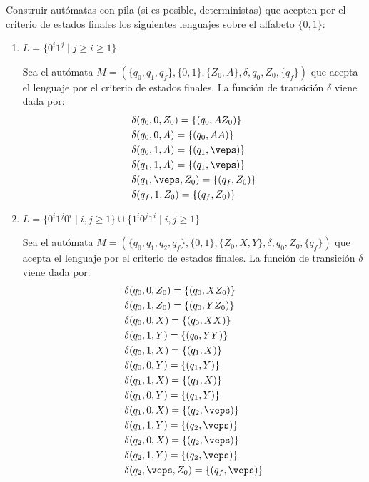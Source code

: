 \begin{ejercicio}\label{ej:1.5.20}
    Construir autómatas con pila (si es posible, deterministas) que acepten por el criterio de estados finales los siguientes lenguajes sobre el alfabeto $\{0,1\}$:
    \begin{enumerate}
        \item $L = \{0^i 1^j \mid j\geq i \geq 1\}$.
        
        Sea el autómata $M = (\{q_0,q_1,q_f\},\{0,1\},\{Z_0,A\},\delta,q_0,Z_0,\{q_f\})$ que acepta el lenguaje por el criterio de estados finales. La función de transición $\delta$ viene dada por:
        \begin{align*}
            &\delta(q_0,0,Z_0) = \{(q_0,AZ_0)\} \\
            &\delta(q_0,0,A) = \{(q_0,AA)\} \\
            &\delta(q_0,1,A) = \{(q_1,\veps)\} \\
            &\delta(q_1,1,A) = \{(q_1,\veps)\} \\
            &\delta(q_1,\veps,Z_0) = \{(q_f,Z_0)\} \\
            &\delta(q_f,1,Z_0) = \{(q_f,Z_0)\}
        \end{align*}
        \item $L = \{0^i 1^j 0^i \mid i,j\geq 1\}\cup \{1^i 0^j 1^i \mid i,j\geq 1\}$
        
        Sea el autómata $M = (\{q_0,q_1,q_2,q_f\},\{0,1\},\{Z_0,X,Y\},\delta,q_0,Z_0,\{q_f\})$ que acepta el lenguaje por el criterio de estados finales. La función de transición $\delta$ viene dada por:
        \begin{align*}
            &\delta(q_0,0,Z_0) = \{(q_0,XZ_0)\} \\
            &\delta(q_0,1,Z_0) = \{(q_0,YZ_0)\} \\
            &\delta(q_0,0,X) = \{(q_0,XX)\} \\
            &\delta(q_0,1,Y) = \{(q_0,YY)\} \\
            &\delta(q_0,1,X) = \{(q_1,X)\} \\
            &\delta(q_0,0,Y) = \{(q_1,Y)\} \\
            &\delta(q_1,1,X) = \{(q_1,X)\} \\
            &\delta(q_1,0,Y) = \{(q_1,Y)\} \\
            &\delta(q_1,0,X) = \{(q_2,\veps)\} \\
            &\delta(q_1,1,Y) = \{(q_2,\veps)\} \\
            &\delta(q_2,0,X) = \{(q_2,\veps)\} \\
            &\delta(q_2,1,Y) = \{(q_2,\veps)\} \\
            &\delta(q_2,\veps,Z_0) = \{(q_f,\veps)\}
        \end{align*}
    \end{enumerate}
\end{ejercicio}

